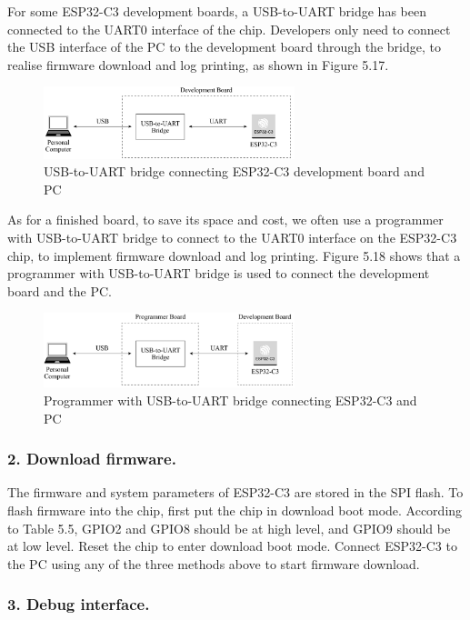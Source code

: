 \documentclass[a4paper,12pt,openany]{book}
\begin{document}
For some ESP32-C3 development boards, a USB-to-UART bridge has been connected to the UART0 interface of the chip. Developers only need to connect the USB interface of the PC to the development board through the bridge, to realise firmware download and log printing, as shown in Figure 5.17.

\begin{figure}[h!]
    \centering
    \includegraphics[width=0.65\textwidth]{D5Z/5-17}
    \caption{USB-to-UART bridge connecting ESP32-C3 development board and PC}
\end{figure}

As for a finished board, to save its space and cost, we often use a programmer with USB-to-UART bridge to connect to the UART0 interface on the ESP32-C3 chip, to implement firmware download and log printing. Figure 5.18 shows that a programmer with USB-to-UART bridge is used to connect the development board and the PC.

\begin{figure}[h!]
    \centering
    \includegraphics[width=0.65\textwidth]{D5Z/5-18}
    \caption{Programmer with USB-to-UART bridge connecting ESP32-C3 and PC}
\end{figure}

\subsubsection{2. Download firmware.}
The firmware and system parameters of ESP32-C3 are stored in the SPI flash. To flash firmware into the chip, first put the chip in download boot mode. According to Table 5.5, GPIO2 and GPIO8 should be at high level, and GPIO9 should be at low level. Reset the chip to enter download boot mode. Connect ESP32-C3 to the PC using any of the three methods above to start firmware download.

\subsubsection{3. Debug interface.}
\end{document}
